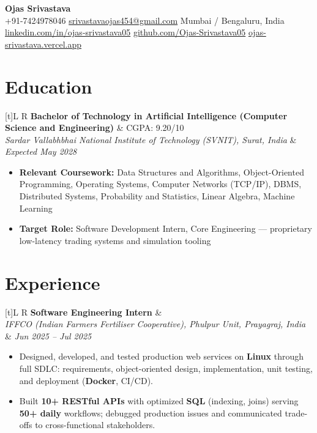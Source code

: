 \documentclass[a4paper,10pt]{article}
\newcommand{\resumeSubheading}[4]{
  \vspace{0.5mm}
  \noindent
  \begin{tabularx}{\textwidth}[t]{L R}
    \textbf{#1} & #4 \\
    \textit{#3} & \textit{#2} \\
  \end{tabularx}
  \vspace{-0.5mm}
}
\begin{document}
\selectfont

\begin{center}
  {\LARGE \textbf{Ojas Srivastava}} \\[1mm]
  \small
  +91-7424978046 \textbar{}
  \href{mailto:srivastavaojas454@gmail.com}{srivastavaojas454@gmail.com} \textbar{}
  Mumbai / Bengaluru, India \\[0.5mm]
  \href{https://linkedin.com/in/ojas-srivastava05}{linkedin.com/in/ojas-srivastava05} \textbar{}
  \href{https://github.com/Ojas-Srivastava05}{github.com/Ojas-Srivastava05} \textbar{}
  \href{https://ojas-srivastava.vercel.app}{ojas-srivastava.vercel.app}
\end{center}

\vspace{-1mm}

\section{Education}
\small
\resumeSubheading
  {Bachelor of Technology in Artificial Intelligence (Computer Science and Engineering)}{Expected May 2028}
  {Sardar Vallabhbhai National Institute of Technology (SVNIT), Surat, India}{CGPA: 9.20/10}
\begin{itemize}
  \item \textbf{Relevant Coursework:} Data Structures and Algorithms, Object-Oriented Programming, Operating Systems, Computer Networks (TCP/IP), DBMS, Distributed Systems, Probability and Statistics, Linear Algebra, Machine Learning
  \item \textbf{Target Role:} Software Development Intern, Core Engineering --- proprietary low-latency trading systems and simulation tooling
\end{itemize}

\section{Experience}
\small
\resumeSubheading
  {Software Engineering Intern}{Jun 2025 -- Jul 2025}
  {IFFCO (Indian Farmers Fertiliser Cooperative), Phulpur Unit, Prayagraj, India}{}
\begin{itemize}
  \item Designed, developed, and tested production web services on \textbf{Linux} through full SDLC: requirements, object-oriented design, implementation, unit testing, and deployment (\textbf{Docker}, CI/CD).
  \item Built \textbf{10+ RESTful APIs} with optimized \textbf{SQL} (indexing, joins) serving \textbf{50+ daily} workflows; debugged production issues and communicated trade-offs to cross-functional stakeholders.
\end{itemize}
\end{document}
